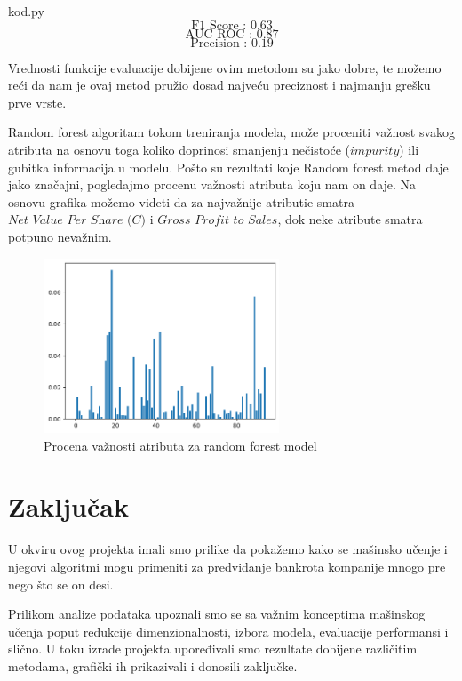 \documentclass[12pt]{article}
\theoremstyle{definition}
\theoremstyle{remark}
\begin{document}
\hfill

{kod.py}
$$
\text{F1 Score : 0.63}
$$
$$
\text{AUC ROC : 0.87}
$$
$$
\text{Precision : 0.19}
$$
\hfill

Vrednosti funkcije evaluacije dobijene ovim metodom su jako dobre, te možemo reći da nam je ovaj metod pružio dosad najveću preciznost i najmanju grešku prve vrste.

Random forest algoritam tokom treniranja modela, može proceniti važnost svakog atributa na osnovu toga koliko doprinosi smanjenju nečistoće ($\textit{impurity}$) ili gubitka informacija u modelu. Pošto su rezultati koje Random forest metod daje jako značajni, pogledajmo procenu važnosti atributa koju nam on daje. Na osnovu grafika možemo videti da za najvažnije atributie smatra $\textit{Net Value Per Share (C)}$ i $\textit{Gross Profit to Sales}$, dok neke atribute smatra potpuno nevažnim.


\begin{figure}[htp]
    \centering
    \includegraphics[width=7cm]{randomforestvaznost.png}
    \caption{Procena važnosti atributa za random forest model}
    \label{fig:galaxy}
\end{figure}


\newpage

\section{Zaključak}

\vspace{1cm}

U okviru ovog projekta imali smo prilike da pokažemo kako se mašinsko učenje i njegovi algoritmi mogu primeniti za predviđanje bankrota kompanije mnogo pre nego što se on desi.

Prilikom analize podataka upoznali smo se sa važnim konceptima mašinskog učenja poput redukcije dimenzionalnosti, izbora modela, evaluacije performansi i slično. U toku izrade projekta upoređivali smo rezultate dobijene različitim metodama, grafički ih prikazivali i donosili zaključke.
\end{document}
